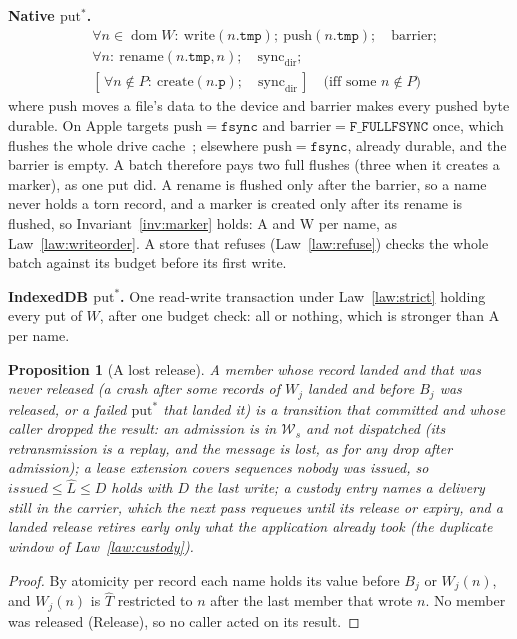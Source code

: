 \documentclass[journal]{IEEEtran}
\newtheorem{proposition}{Proposition}
\newcommand{\dom}{\operatorname{dom}}
\newcommand{\W}{\mathcal{W}}
\begin{document}
\textbf{Native $\mathrm{put}^{*}$.}
\begin{align*}
&\forall n\in\dom W:\ \mathrm{write}(n.\mathtt{tmp});\ \mathrm{push}(n.\mathtt{tmp});\quad
\mathrm{barrier};\\
&\forall n:\ \mathrm{rename}(n.\mathtt{tmp},n);\quad \mathrm{sync}_{\mathrm{dir}};\\
&[\,\forall n\notin P:\ \mathrm{create}(n.\mathtt{p});\quad
\mathrm{sync}_{\mathrm{dir}}\,]\quad\text{(iff some $n\notin P$)}
\end{align*}
where $\mathrm{push}$ moves a file's data to the device and $\mathrm{barrier}$ makes every
pushed byte durable.  On Apple targets $\mathrm{push}=\mathtt{fsync}$ and
$\mathrm{barrier}=\mathtt{F\_FULLFSYNC}$ once, which flushes the whole drive
cache~\cite{AppleFsync}; elsewhere $\mathrm{push}=\mathtt{fsync}$, already durable, and
the barrier is empty.  A batch therefore pays two full flushes (three when it creates a
marker), as one $\mathrm{put}$ did.  A rename is flushed only after the barrier, so a name
never holds a torn record, and a marker is created only after its rename is flushed, so
Invariant~\ref{inv:marker} holds: A and W per name, as Law~\ref{law:writeorder}.  A store
that refuses (Law~\ref{law:refuse}) checks the whole batch against its budget before its
first write.

\textbf{IndexedDB $\mathrm{put}^{*}$.} One read-write transaction under
Law~\ref{law:strict} holding every put of $W$, after one budget check: all or nothing,
which is stronger than A per name.

\begin{proposition}[A lost release]\label{prop:lostrelease}
A member whose record landed and that was never released (a crash after some records of
$W_j$ landed and before $B_j$ was released, or a failed $\mathrm{put}^{*}$ that landed it)
is a transition that committed and whose caller dropped the result: an admission is in
$\W_s$ and not dispatched (its retransmission is a replay, and the message is lost, as for
any drop after admission); a lease extension covers sequences nobody was issued, so
$\mathit{issued}\le\hat L\le D$ holds with $D$ the last write; a custody entry names a
delivery still in the carrier, which the next pass requeues until its release or expiry, and a
landed release retires early only what the application already took (the duplicate window
of Law~\ref{law:custody}).
\end{proposition}
\begin{proof}
By atomicity per record each name holds its value before $B_j$ or $W_j(n)$, and $W_j(n)$
is $\hat T$ restricted to $n$ after the last member that wrote $n$.  No member was
released (Release), so no caller acted on its result.
\end{proof}
\end{document}
